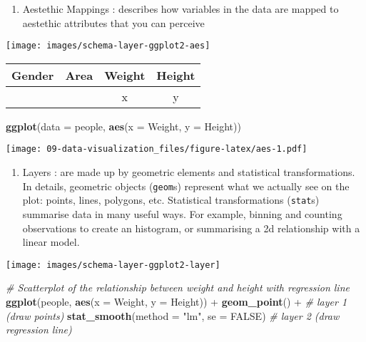 \documentclass[]{book}
\newenvironment{Shaded}{\begin{snugshade}}{\end{snugshade}}
\newcommand{\KeywordTok}[1]{\textcolor[rgb]{0.13,0.29,0.53}{\textbf{{#1}}}}
\newcommand{\DataTypeTok}[1]{\textcolor[rgb]{0.13,0.29,0.53}{{#1}}}
\newcommand{\StringTok}[1]{\textcolor[rgb]{0.31,0.60,0.02}{{#1}}}
\newcommand{\CommentTok}[1]{\textcolor[rgb]{0.56,0.35,0.01}{\textit{{#1}}}}
\newcommand{\OtherTok}[1]{\textcolor[rgb]{0.56,0.35,0.01}{{#1}}}
\newcommand{\NormalTok}[1]{{#1}}
\providecommand{\tightlist}{%
  \setlength{\itemsep}{0pt}\setlength{\parskip}{0pt}}
\def\tightlist{}
\begin{document}
\begin{enumerate}
\def\labelenumi{\arabic{enumi}.}
\setcounter{enumi}{1}
\tightlist
\item
   {Aestethic Mappings} : describes how variables in the data are mapped
  to aestethic attributes that you can perceive
\end{enumerate}

\texttt{[image: images/schema-layer-ggplot2-aes]}

\begin{longtable}[]{@{}llcc@{}}
\toprule
Gender & Area & Weight & Height\tabularnewline
\midrule
\endhead
& & x & y\tabularnewline
\bottomrule
\end{longtable}

\begin{Shaded}
\begin{Highlighting}[]
\KeywordTok{ggplot}\NormalTok{(}\DataTypeTok{data =} \NormalTok{people, }\KeywordTok{aes}\NormalTok{(}\DataTypeTok{x =} \NormalTok{Weight, }\DataTypeTok{y =} \NormalTok{Height))}
\end{Highlighting}
\end{Shaded}

\texttt{[image: 09-data-visualization\_files/figure-latex/aes-1.pdf]}

\begin{enumerate}
\def\labelenumi{\arabic{enumi}.}
\setcounter{enumi}{2}
\tightlist
\item
   {Layers} : are made up by geometric elements and statistical
  transformations. In details, geometric objects (\texttt{geom}s)
  represent what we actually see on the plot: points, lines, polygons,
  etc. Statistical transformations (\texttt{stat}s) summarise data in
  many useful ways. For example, binning and counting observations to
  create an histogram, or summarising a 2d relationship with a linear
  model.
\end{enumerate}

\texttt{[image: images/schema-layer-ggplot2-layer]}

\begin{Shaded}
\begin{Highlighting}[]
\CommentTok{# Scatterplot of the relationship between weight and height with regression line}
\KeywordTok{ggplot}\NormalTok{(people, }\KeywordTok{aes}\NormalTok{(}\DataTypeTok{x =} \NormalTok{Weight, }\DataTypeTok{y =} \NormalTok{Height)) +}
\StringTok{  }\KeywordTok{geom_point}\NormalTok{() +}\StringTok{ }\CommentTok{# layer 1 (draw points)}
\StringTok{  }\KeywordTok{stat_smooth}\NormalTok{(}\DataTypeTok{method =} \StringTok{"lm"}\NormalTok{, }\DataTypeTok{se =} \OtherTok{FALSE}\NormalTok{) }\CommentTok{# layer 2 (draw regression line) }
\end{Highlighting}
\end{Shaded}
\end{document}
